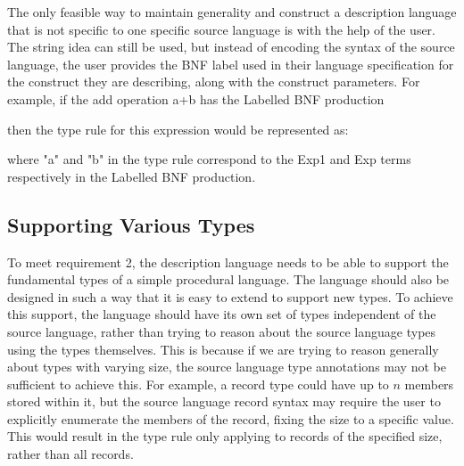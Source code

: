 \documentclass{UoYCSproject}
\begin{document}
The only feasible way to maintain generality and construct a description
language that is not specific to one specific source language is with the
help of the user. The string idea can still be used, but instead of encoding 
the syntax of the source language, the user provides the BNF label used in their
language specification for the construct they are describing, along with the
construct parameters. For example, if the add operation {\ttfamily a+b} has
the Labelled BNF production

then the type rule for this expression would be represented as:

where {\ttfamily "a"} and {\ttfamily "b"} in the type rule correspond to the 
{\ttfamily Exp1} and {\ttfamily Exp} terms respectively in the Labelled BNF 
production.

\subsection{Supporting Various Types}
To meet requirement 2, the description language needs to be able to support the
fundamental types of a simple procedural language. The language should also be
designed in such a way that it is easy to extend to support new types. To achieve
this support, the language should have its own set of types independent of the
source language, rather than trying to reason about the source language types
using the types themselves. This is because if we are trying to reason generally
about types with varying size, the source language type annotations may not
be sufficient to achieve this. For example, a record type could have up to $n$
members stored within it, but the source language record syntax may require the
user to explicitly enumerate the members of the record, fixing the size to a 
specific value. This would result in the type rule only applying to records of
the specified size, rather than all records.
\end{document}
